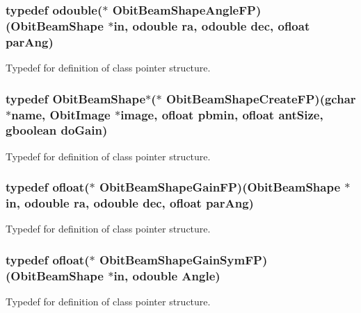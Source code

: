 \subsubsection{\setlength{\rightskip}{0pt plus 5cm}typedef {\bf odouble}($\ast$ {\bf Obit\-Beam\-Shape\-Angle\-FP})({\bf Obit\-Beam\-Shape} $\ast$in, {\bf odouble} ra, {\bf odouble} dec, {\bf ofloat} par\-Ang)}\label{ObitBeamShape_8h_a6}


Typedef for definition of class pointer structure. 

\subsubsection{\setlength{\rightskip}{0pt plus 5cm}typedef {\bf Obit\-Beam\-Shape}$\ast$($\ast$ {\bf Obit\-Beam\-Shape\-Create\-FP})(gchar $\ast$name, {\bf Obit\-Image} $\ast$image, {\bf ofloat} pbmin, {\bf ofloat} ant\-Size, gboolean do\-Gain)}\label{ObitBeamShape_8h_a3}


Typedef for definition of class pointer structure. 

\subsubsection{\setlength{\rightskip}{0pt plus 5cm}typedef {\bf ofloat}($\ast$ {\bf Obit\-Beam\-Shape\-Gain\-FP})({\bf Obit\-Beam\-Shape} $\ast$in, {\bf odouble} ra, {\bf odouble} dec, {\bf ofloat} par\-Ang)}\label{ObitBeamShape_8h_a4}


Typedef for definition of class pointer structure. 

\subsubsection{\setlength{\rightskip}{0pt plus 5cm}typedef {\bf ofloat}($\ast$ {\bf Obit\-Beam\-Shape\-Gain\-Sym\-FP})({\bf Obit\-Beam\-Shape} $\ast$in, {\bf odouble} Angle)}\label{ObitBeamShape_8h_a5}


Typedef for definition of class pointer structure. 



